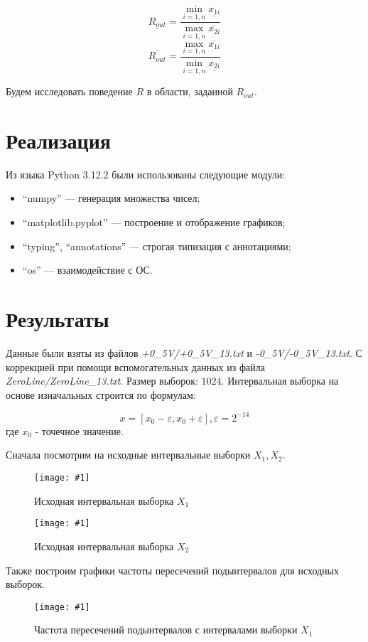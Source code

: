 \documentclass[a4paper,12pt]{article}
\newcommand{\plot}[3]{
  \begin{figure}[H]
    \begin{center}
      \texttt{[image: \#1]}
      \caption{#2}
      \label{#3}
    \end{center}
  \end{figure}
}
\begin{document}
\begin{equation}
  \underline{R_{out}} = \frac{\min_{i=1,n}\underline{x_{1i}}}{\max_{i=1,n}\overline{x_{2i}}}
\end{equation}
\begin{equation}
  \overline{R_{out}} = \frac{\max_{i=1,n}\overline{x_{1i}}}{\min_{i=1,n}\underline{x_{2i}}}
\end{equation}

Будем исследовать поведение $ R $ в области, заданной $ R_{out} $.

\section{Реализация}
\quad Из языка Python 3.12.2 были использованы следующие модули:
\begin{itemize}
  \item ``numpy'' --- генерация множества чисел;
  \item ``matplotlib.pyplot'' --- построение и отображение графиков;
  \item ``typing'', ``annotations'' --- строгая типизация с аннотациями;
  \item ``os'' --- взаимодействие с ОС.
\end{itemize}

\section{Результаты}
\quad Данные были взяты из файлов \textsl{+0\_5V/+0\_5V\_13.txt} и
\textsl{-0\_5V/-0\_5V\_13.txt}. С коррекцией при помощи вспомогательных данных из
файла \textsl{ZeroLine/ZeroLine\_13.txt}. Размер выборок: $ 1024 $.
Интервальная выборка на основе изначальных строится по формулам:

\begin{equation}
  x = [x_0 - \varepsilon, x_0 + \varepsilon], \varepsilon = 2^{-14}
\end{equation}
где $ x_0 $ - точечное значение.

Сначала посмотрим на исходные интервальные выборки $ X_1, X_2 $.
\plot{./images/signal 1.png}{Исходная интервальная выборка $ X_1 $}{p:x1}

\plot{./images/signal 2.png}{Исходная интервальная выборка $ X_2 $}{p:x2}

Также построим графики частоты пересечений подынтервалов для исходных
выборок.
\plot{./images/signal 1 mode hist.png}{Частота пересечений подынтервалов с интервалами выборки $ X_1 $}{p:modaX1}
\end{document}
